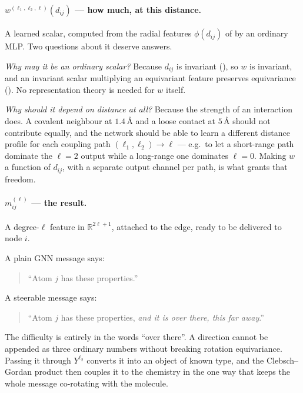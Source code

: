 \documentclass[11pt,a4paper]{report}
\theoremstyle{definition}
\theoremstyle{remark}
\newcommand{\RR}{\mathbb R}
\begin{document}
\paragraph{$w^{(\ell_1,\ell_2,\ell)}(d_{ij})$ --- how much, at this distance.}
A learned scalar, computed from the radial features
$\phi(d_{ij})$ of  by an ordinary MLP. Two
questions about it deserve answers.

\emph{Why may it be an ordinary scalar?} Because $d_{ij}$ is invariant
(), so $w$ is invariant, and an invariant scalar
multiplying an equivariant feature preserves equivariance
(). No representation theory is needed for $w$
itself.

\emph{Why should it depend on distance at all?} Because the strength of an
interaction does. A covalent neighbour at $1.4$\,\r A and a loose contact at
$5$\,\r A should not contribute equally, and the network should be able to
learn a different distance profile for each coupling path
$(\ell_1,\ell_2)\to\ell$ --- e.g.\ to let a short-range path dominate the
$\ell=2$ output while a long-range one dominates $\ell=0$. Making $w$ a
function of $d_{ij}$, with a separate output channel per path, is what
grants that freedom.

\paragraph{$m^{(\ell)}_{ij}$ --- the result.}
A degree-$\ell$ feature in $\RR^{2\ell+1}$, attached to the edge, ready to be
delivered to node $i$.

\begin{tcolorbox}[colback=green!3,colframe=green!35!black,title={What the message says}]
A plain GNN message says:
\begin{quote}
``Atom $j$ has these properties.''
\end{quote}
A steerable message says:
\begin{quote}
``Atom $j$ has these properties, \emph{and it is over there, this far
away}.''
\end{quote}
The difficulty is entirely in the words ``over there''. A direction cannot
be appended as three ordinary numbers without breaking rotation
equivariance. Passing it through $Y^{\ell_2}$ converts it into an object of
known type, and the Clebsch--Gordan product then couples it to the
chemistry in the one way that keeps the whole message co-rotating with the
molecule.
\end{tcolorbox}
\end{document}
